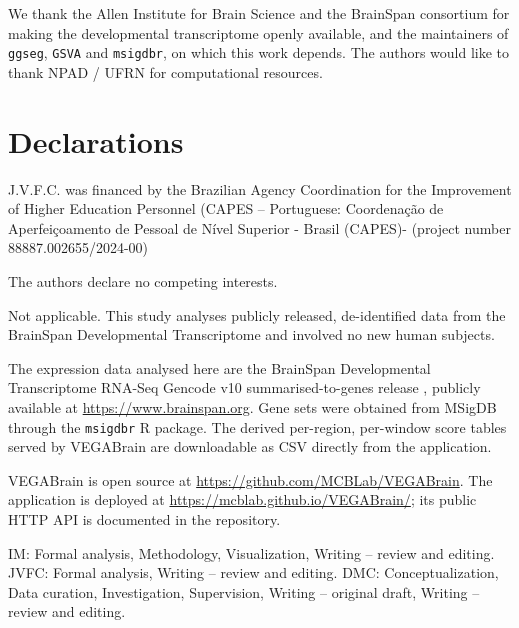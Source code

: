 \documentclass[pdflatex,sn-basic]{sn-jnl}
\begin{document}

We thank the Allen Institute for Brain Science and the BrainSpan consortium for
making the developmental transcriptome openly available, and the maintainers of
\texttt{ggseg}, \texttt{GSVA} and \texttt{msigdbr}, on which this work depends.
The authors would like to thank NPAD / UFRN for computational resources.

\section*{Declarations}

J.V.F.C. was financed by the Brazilian Agency Coordination for the Improvement of Higher Education Personnel (CAPES – Portuguese: Coordenação de Aperfeiçoamento de Pessoal de Nível Superior - Brasil (CAPES)- (project number 88887.002655/2024-00)

The authors declare no competing interests.

Not applicable. This study analyses publicly released, de-identified data from
the BrainSpan Developmental Transcriptome and involved no new human subjects.

The expression data analysed here are the BrainSpan Developmental Transcriptome
RNA-Seq Gencode v10 summarised-to-genes release \citep{BrainSpan2011,Li2018},
publicly available at
\url{https://www.brainspan.org}. Gene sets were obtained from MSigDB through the
\texttt{msigdbr} R package. The derived per-region, per-window score tables
served by VEGABrain are downloadable as CSV directly from the application.

VEGABrain is open source at \url{https://github.com/MCBLab/VEGABrain}. The
application is deployed at \url{https://mcblab.github.io/VEGABrain/}; its public
HTTP API is documented in the repository.

IM: Formal analysis, Methodology, Visualization, Writing – review and editing. 
JVFC: Formal analysis, Writing – review and editing. 
DMC: Conceptualization, Data curation, Investigation, Supervision, Writing – original draft, Writing – review and editing.

\bigskip


\end{document}
